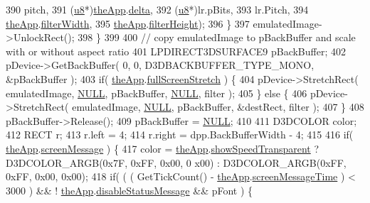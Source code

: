 \begin{DoxyCode}
390                 pitch,
391                 (\mbox{\hyperlink{_system_8h_aed742c436da53c1080638ce6ef7d13de}{u8}}*)\mbox{\hyperlink{_v_b_a_8cpp_a8095a9d06b37a7efe3723f3218ad8fb3}{theApp}}.\mbox{\hyperlink{class_v_b_a_ae53d4a6574bd47657fa6bd76eabd8543}{delta}},
392                 (\mbox{\hyperlink{_system_8h_aed742c436da53c1080638ce6ef7d13de}{u8}}*)lr.pBits,
393                 lr.Pitch,
394                 \mbox{\hyperlink{_v_b_a_8cpp_a8095a9d06b37a7efe3723f3218ad8fb3}{theApp}}.\mbox{\hyperlink{class_v_b_a_a1ae8b3a4ed9fd2a3783868ae5d38c3bc}{filterWidth}},
395                 \mbox{\hyperlink{_v_b_a_8cpp_a8095a9d06b37a7efe3723f3218ad8fb3}{theApp}}.\mbox{\hyperlink{class_v_b_a_a1c5e3ef2e69bfe2a6a877606fbb4de9c}{filterHeight}});
396         \}
397         emulatedImage->UnlockRect();
398     \}
399 
400     \textcolor{comment}{// copy emulatedImage to pBackBuffer and scale with or without aspect ratio}
401     LPDIRECT3DSURFACE9 pBackBuffer;
402     pDevice->GetBackBuffer( 0, 0, D3DBACKBUFFER\_TYPE\_MONO, &pBackBuffer );
403     \textcolor{keywordflow}{if}( \mbox{\hyperlink{_v_b_a_8cpp_a8095a9d06b37a7efe3723f3218ad8fb3}{theApp}}.\mbox{\hyperlink{class_v_b_a_a00bd5b85110bd763ad39eb4a9fb403a1}{fullScreenStretch}} ) \{
404         pDevice->StretchRect( emulatedImage, \mbox{\hyperlink{getopt1_8c_a070d2ce7b6bb7e5c05602aa8c308d0c4}{NULL}}, pBackBuffer, \mbox{\hyperlink{getopt1_8c_a070d2ce7b6bb7e5c05602aa8c308d0c4}{NULL}}, filter );
405     \} \textcolor{keywordflow}{else} \{
406         pDevice->StretchRect( emulatedImage, \mbox{\hyperlink{getopt1_8c_a070d2ce7b6bb7e5c05602aa8c308d0c4}{NULL}}, pBackBuffer, &destRect, filter );
407     \}
408     pBackBuffer->Release();
409     pBackBuffer = \mbox{\hyperlink{getopt1_8c_a070d2ce7b6bb7e5c05602aa8c308d0c4}{NULL}};
410 
411     D3DCOLOR color;
412     RECT r;
413     r.left = 4;
414     r.right = dpp.BackBufferWidth - 4;
415 
416     \textcolor{keywordflow}{if}( \mbox{\hyperlink{_v_b_a_8cpp_a8095a9d06b37a7efe3723f3218ad8fb3}{theApp}}.\mbox{\hyperlink{class_v_b_a_a204d14d33aebd442db9affee1cc4f3a8}{screenMessage}} ) \{
417         color = \mbox{\hyperlink{_v_b_a_8cpp_a8095a9d06b37a7efe3723f3218ad8fb3}{theApp}}.\mbox{\hyperlink{class_v_b_a_a0a2ca5a7091f9c79b39ea0916dd88a05}{showSpeedTransparent}} ? D3DCOLOR\_ARGB(0x7F, 0xFF, 0x00, 0
      x00) : D3DCOLOR\_ARGB(0xFF, 0xFF, 0x00, 0x00);
418         \textcolor{keywordflow}{if}( ( ( GetTickCount() - \mbox{\hyperlink{_v_b_a_8cpp_a8095a9d06b37a7efe3723f3218ad8fb3}{theApp}}.\mbox{\hyperlink{class_v_b_a_a27f8c0f4add5a8242470289874dd601c}{screenMessageTime}} ) < 3000 ) && !
      \mbox{\hyperlink{_v_b_a_8cpp_a8095a9d06b37a7efe3723f3218ad8fb3}{theApp}}.\mbox{\hyperlink{class_v_b_a_a7bfea5ab60b19d26053b22ce070e2248}{disableStatusMessage}} && pFont ) \{

\end{DoxyCode}
